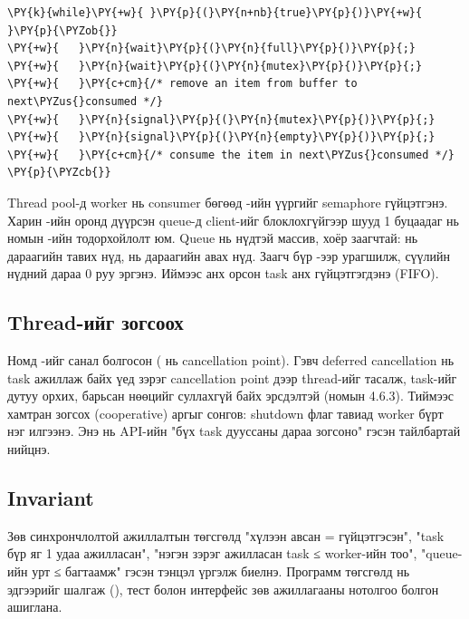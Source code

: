 \documentclass[12pt,a4paper]{article}
\begin{document}
\par\noindent\begin{minipage}{\linewidth}\setlength{\topsep}{1pt}\setlength{\partopsep}{0pt}
\label{lst:book}
\begin{Verbatim}[commandchars=\\\{\}]
\PY{k}{while}\PY{+w}{ }\PY{p}{(}\PY{n+nb}{true}\PY{p}{)}\PY{+w}{ }\PY{p}{\PYZob{}}
\PY{+w}{   }\PY{n}{wait}\PY{p}{(}\PY{n}{full}\PY{p}{)}\PY{p}{;}
\PY{+w}{   }\PY{n}{wait}\PY{p}{(}\PY{n}{mutex}\PY{p}{)}\PY{p}{;}
\PY{+w}{   }\PY{c+cm}{/* remove an item from buffer to next\PYZus{}consumed */}
\PY{+w}{   }\PY{n}{signal}\PY{p}{(}\PY{n}{mutex}\PY{p}{)}\PY{p}{;}
\PY{+w}{   }\PY{n}{signal}\PY{p}{(}\PY{n}{empty}\PY{p}{)}\PY{p}{;}
\PY{+w}{   }\PY{c+cm}{/* consume the item in next\PYZus{}consumed */}
\PY{p}{\PYZcb{}}
\end{Verbatim}
\end{minipage}

Thread pool-д worker нь consumer бөгөөд -ийн үүргийг  semaphore гүйцэтгэнэ. Харин -ийн оронд дүүрсэн queue-д client-ийг блоклохгүйгээр шууд 1 буцаадаг нь номын -ийн тодорхойлолт юм. Queue нь  нүдтэй массив, хоёр заагчтай:  нь дараагийн тавих нүд,  нь дараагийн авах нүд. Заагч бүр -ээр урагшилж, сүүлийн нүдний дараа 0 руу эргэнэ. Иймээс анх орсон task анх гүйцэтгэгдэнэ (FIFO).

\subsection{Thread-ийг зогсоох}

Номд -ийг санал болгосон ( нь cancellation point). Гэвч deferred cancellation нь task ажиллаж байх үед  зэрэг cancellation point дээр thread-ийг тасалж, task-ийг дутуу орхих, барьсан нөөцийг суллахгүй байх эрсдэлтэй (номын 4.6.3). Тиймээс хамтран зогсох (cooperative) аргыг сонгов: shutdown флаг тавиад worker бүрт нэг  илгээнэ. Энэ нь API-ийн "бүх task дууссаны дараа зогсоно" гэсэн тайлбартай нийцнэ.

\subsection{Invariant}

Зөв синхрончлолтой ажиллалтын төгсгөлд "хүлээн авсан = гүйцэтгэсэн", "task бүр яг 1 удаа ажилласан", "нэгэн зэрэг ажилласан task ≤ worker-ийн тоо", "queue-ийн урт ≤ багтаамж" гэсэн тэнцэл үргэлж биелнэ. Программ төгсгөлд нь эдгээрийг шалгаж (), тест болон интерфейс зөв ажиллагааны нотолгоо болгон ашиглана.
\end{document}
